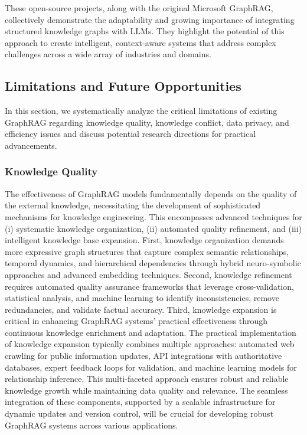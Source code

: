 \documentclass[lettersize,journal]{IEEEtran}
\begin{document}
These open-source projects, along with the original Microsoft GraphRAG, collectively demonstrate the adaptability and growing importance of integrating structured knowledge graphs with LLMs. They highlight the potential of this approach to create intelligent, context-aware systems that address complex challenges across a wide array of industries and domains.

\subsection{Limitations and Future Opportunities}\label{sec:future}\label{sec:future}
In this section, we systematically analyze the critical limitations of existing GraphRAG regarding knowledge quality, knowledge conflict, data privacy, and efficiency issues and discuss potential research directions for practical advancements.

\subsubsection{Knowledge Quality} 
The effectiveness of GraphRAG models fundamentally depends on the quality of the external knowledge, necessitating the development of sophisticated mechanisms for knowledge engineering. This encompasses advanced techniques for (i) systematic knowledge organization, (ii) automated quality refinement, and (iii) intelligent knowledge base expansion. First, knowledge organization demands more expressive graph structures that capture complex semantic relationships, temporal dynamics, and hierarchical dependencies through hybrid neuro-symbolic approaches and advanced embedding techniques. Second, knowledge refinement requires automated quality assurance frameworks that leverage cross-validation, statistical analysis, and machine learning to identify inconsistencies, remove redundancies, and validate factual accuracy. Third, knowledge expansion is critical in enhancing GraphRAG systems' practical effectiveness through continuous knowledge enrichment and adaptation. The practical implementation of knowledge expansion typically combines multiple approaches: automated web crawling for public information updates, API integrations with authoritative databases, expert feedback loops for validation, and machine learning models for relationship inference. This multi-faceted approach ensures robust and reliable knowledge growth while maintaining data quality and relevance. The seamless integration of these components, supported by a scalable infrastructure for dynamic updates and version control, will be crucial for developing robust GraphRAG systems across various applications.
\end{document}
